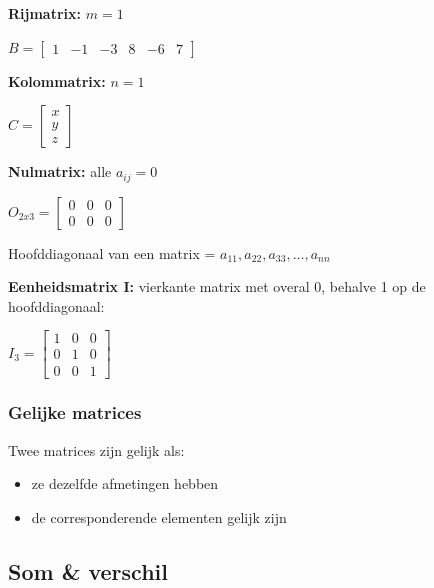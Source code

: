 \documentclass{article}
\begin{document}
\textbf{Rijmatrix:} $m = 1$

\begin{center}
    $B = \begin{bmatrix}
        1 & -1 & -3 & 8 & -6 & 7
    \end{bmatrix}$
\end{center}

\textbf{Kolommatrix:} $n = 1$

\begin{center}
    $C = \begin{bmatrix}
        x\\
        y\\
        z
    \end{bmatrix}$
\end{center}


\textbf{Nulmatrix:} alle $a_{ij} = 0$ 

\begin{center}
    $O_{2x3} = \begin{bmatrix}
        0 & 0 & 0\\
        0 & 0 & 0
    \end{bmatrix}$
\end{center}


Hoofddiagonaal van een matrix = $a_{11}, a_{22}, a_{33}, \dots, a_{nn}$

\textbf{Eenheidsmatrix I:} vierkante matrix met overal 0, behalve 1 op de hoofddiagonaal:

\begin{center}
    $I_3 = \begin{bmatrix}
        1 & 0 & 0\\
        0 & 1 & 0\\
        0 & 0 & 1
    \end{bmatrix}$
\end{center}

\subsubsection{Gelijke matrices}

Twee matrices zijn gelijk als:

\begin{itemize}
    \item ze dezelfde afmetingen hebben
    \item de corresponderende elementen gelijk zijn
\end{itemize}


\subsection{Som \& verschil}
\end{document}
